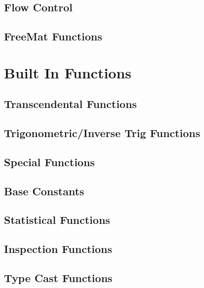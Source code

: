 \documentclass{book}
\begin{document}
\section{Flow Control}












\section{FreeMat Functions}









\chapter{Built In Functions}
\section{Transcendental Functions}


\section{Trigonometric/Inverse Trig Functions}










\section{Special Functions}










\section{Base Constants}







\section{Statistical Functions}


\section{Inspection Functions}












\section{Type Cast Functions}










\end{document}
